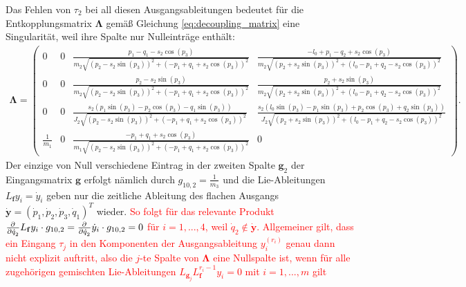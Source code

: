 Das Fehlen von $\tau_2$ bei all diesen Ausgangsableitungen bedeutet für die Entkopplungsmatrix $\boldsymbol{\Lambda}$ gemäß Gleichung \eqref{eq:decoupling_matrix} eine Singularität, weil ihre Spalte nur Nulleinträge enthält:
\begin{align}
	\boldsymbol{\Lambda} = 
	\left(\begin{smallmatrix}
		0 & 0 & \frac{p_{1} - q_{1} - s_{2} \cos{\left(p_{3} \right)}}{m_{2} \sqrt{\left(p_{2} - s_{2} \sin{\left(p_{3} \right)}\right)^{2} + \left(- p_{1} + q_{1} + s_{2} \cos{\left(p_{3} \right)}\right)^{2}}} & \frac{- l_{0} + p_{1} - q_{2} + s_{2} \cos{\left(p_{3} \right)}}{m_{2} \sqrt{\left(p_{2} + s_{2} \sin{\left(p_{3} \right)}\right)^{2} + \left(l_{0} - p_{1} + q_{2} - s_{2} \cos{\left(p_{3} \right)}\right)^{2}}}\\
		0 & 0 & \frac{p_{2} - s_{2} \sin{\left(p_{3} \right)}}{m_{2} \sqrt{\left(p_{2} - s_{2} \sin{\left(p_{3} \right)}\right)^{2} + \left(- p_{1} + q_{1} + s_{2} \cos{\left(p_{3} \right)}\right)^{2}}} & \frac{p_{2} + s_{2} \sin{\left(p_{3} \right)}}{m_{2} \sqrt{\left(p_{2} + s_{2} \sin{\left(p_{3} \right)}\right)^{2} + \left(l_{0} - p_{1} + q_{2} - s_{2} \cos{\left(p_{3} \right)}\right)^{2}}}\\
		0 & 0 & \frac{s_{2} \left(p_{1} \sin{\left(p_{3} \right)} - p_{2} \cos{\left(p_{3} \right)} - q_{1} \sin{\left(p_{3} \right)}\right)}{J_{2} \sqrt{\left(p_{2} - s_{2} \sin{\left(p_{3} \right)}\right)^{2} + \left(- p_{1} + q_{1} + s_{2} \cos{\left(p_{3} \right)}\right)^{2}}} & \frac{s_{2} \left(l_{0} \sin{\left(p_{3} \right)} - p_{1} \sin{\left(p_{3} \right)} + p_{2} \cos{\left(p_{3} \right)} + q_{2} \sin{\left(p_{3} \right)}\right)}{J_{2} \sqrt{\left(p_{2} + s_{2} \sin{\left(p_{3} \right)}\right)^{2} + \left(l_{0} - p_{1} + q_{2} - s_{2} \cos{\left(p_{3} \right)}\right)^{2}}}\\
		\frac{1}{m_{1}} & 0 & \frac{- p_{1} + q_{1} + s_{2} \cos{\left(p_{3} \right)}}{m_{1} \sqrt{\left(p_{2} - s_{2} \sin{\left(p_{3} \right)}\right)^{2} + \left(- p_{1} + q_{1} + s_{2} \cos{\left(p_{3} \right)}\right)^{2}}} & 0
	\end{smallmatrix}\right) .
\end{align}
Der einzige von Null verschiedene Eintrag in der zweiten Spalte $\mathbf{g}_2$ der Eingangsmatrix $\mathbf{g}$ erfolgt nämlich durch $g_{10, 2} = \frac{1}{m_3}$ und die Lie-Ableitungen $L_{\mathbf{f}} y_i = \dot{y}_i$ geben nur die zeitliche Ableitung des flachen Ausgangs $\dot{\mathbf{y}} = (\dot{p}_1, \dot{p}_2, \dot{p}_3, \dot{q}_1)^T$ wieder. \textcolor{red}{So folgt für das relevante Produkt $\frac{\partial^{}}{\partial{\dot{q}_2}^{}} L_{\mathbf{f}} y_i \cdot g_{10, 2} = \frac{\partial^{}}{\partial{\dot{q}_2}^{}} \dot{y}_i \cdot g_{10, 2} = 0$ für $i = 1,..., 4$, weil $\dot{q}_2 \not\in \dot{\mathbf{y}}$. Allgemeiner gilt, dass ein Eingang $\tau_j$ in den Komponenten der Ausgangsableitung $y_i^{(r_i)}$ genau dann nicht explizit auftritt, also die $j$-te Spalte von $\boldsymbol{\Lambda}$ eine Nullspalte ist, wenn für alle zugehörigen gemischten Lie-Ableitungen $L_{\mathbf{g}_j} L_{\mathbf{f}}^{r_i-1} y_i = 0$ mit $i = 1, ..., m$ gilt \cite[S. 201]{NLRT_Roebenack}}

